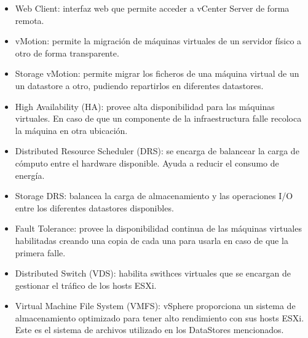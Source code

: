 \begin{itemize}
    \item Web Client: interfaz web que permite acceder a vCenter Server de forma remota.
    \item vMotion: permite la migración de máquinas virtuales de un servidor físico a otro de forma transparente.
    \item Storage vMotion: permite migrar los ficheros de una máquina virtual de un un datastore a otro, pudiendo repartirlos en diferentes datastores.
    \item High Availability (HA): provee alta disponibilidad para las máquinas virtuales. En caso de que un componente de la infraestructura falle recoloca la máquina en otra ubicación.
    \item Distributed Resource Scheduler (DRS): se encarga de balancear la carga de cómputo entre el hardware disponible. Ayuda a reducir el consumo de energía.
    \item Storage DRS: balancea la carga de almacenamiento y las operaciones I/O entre los diferentes datastores disponibles.
    \item Fault Tolerance: provee la disponibilidad continua de las máquinas virtuales habilitadas creando una copia de cada una  para usarla en caso de que la primera falle.
    \item Distributed Switch (VDS): habilita swithces virtuales que se encargan de gestionar el tráfico de los hosts ESXi.
    \item Virtual Machine File System (VMFS): vSphere proporciona un sistema de almacenamiento optimizado para tener alto rendimiento con sus hosts ESXi. Este es el sistema de archivos utilizado en los DataStores mencionados.
\end{itemize}


